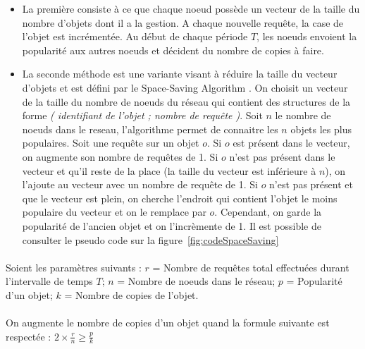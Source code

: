 \documentclass[12pt]{article}
\begin{document}
\begin{itemize}
    \item La première consiste à ce que chaque noeud possède un vecteur de la taille du nombre d'objets dont il a la gestion. A chaque nouvelle requête, la case de l'objet est incrémentée. Au début de chaque période $T$, les noeuds envoient la popularité aux autres noeuds et décident du nombre de copies à faire.
    \item La seconde méthode est une variante visant à réduire la taille du vecteur d'objets et est défini par le Space-Saving Algorithm \cite{SpaceSaving}. On choisit un vecteur de la taille du nombre de noeuds du réseau qui contient des structures de la forme \textit{( identifiant de l'objet ; nombre de requête )}. Soit $n$ le nombre de noeuds dans le reseau, l'algorithme permet de connaitre les $n$ objets les plus populaires. \newline
          \newline
          Soit une requête sur un objet $o$.\newline
          Si $o$ est présent dans le vecteur, on augmente son nombre de requêtes de 1. \newline
          Si $o$ n'est pas présent dans le vecteur et qu'il reste de la place (la taille du vecteur est inférieure à $n$), on l'ajoute au vecteur avec un nombre de requête de 1. \newline
          Si $o$ n'est pas présent et que le vecteur est plein, on cherche l'endroit qui contient l'objet le moins populaire du vecteur et on le remplace par $o$. Cependant, on garde la popularité de l'ancien objet et on l'incrèmente de 1. \newline
          Il est possible de consulter le pseudo code sur la figure~\ref{fig:codeSpaceSaving}
\end{itemize}

\paragraph{}Soient les paramètres suivants : \newline
            $r$ = Nombre de requêtes total effectuées durant l'intervalle de temps $T$; \newline
            $n$ = Nombre de noeuds dans le réseau; \newline
            $p$ = Popularité d'un objet; \newline
            $k$ = Nombre de copies de l'objet.

\paragraph{} On augmente le nombre de copies d'un objet quand la formule suivante est respectée :  $ 2 \times \frac{r}{n} \geq \frac{p}{k} $
\end{document}
